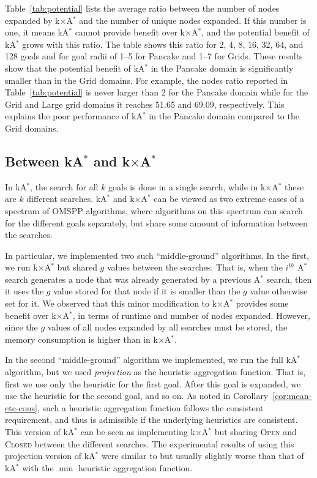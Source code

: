 \documentclass[smallextended]{svjour3}       %
\newcommand{\omspp}{\ac{OMSPP}\xspace}
\newcommand{\astar}{A$^*$\xspace}
\newcommand{\kastar}{kA$^*$\xspace}
\newcommand{\kxastar}{k$\times$A$^*$\xspace}
\newcommand{\open}{\textsc{Open}\xspace}
\newcommand{\closed}{\textsc{Closed}\xspace}
\newcommand{\axiomcons}{consistent\xspace}
\begin{document}
Table~\ref{tab:potential} lists the average ratio between the number of nodes expanded by \kxastar and the number of unique nodes expanded. If this number is one, it means \kastar cannot provide benefit over \kxastar, and the potential benefit of \kastar grows with this ratio. 
The table shows this ratio for 2, 4, 8, 16, 32, 64, and 128 goals and for goal radii of 1--5 for Pancake and 1--7 for Grids. 
These results show that the potential benefit of \kastar in the Pancake domain is significantly smaller than in the Grid domains. For example, the nodes ratio reported in Table~\ref{tab:potential} is never larger than 2 for the Pancake domain while for the Grid and Large grid domains it reaches 51.65 and 69.09, respectively. 
This explains the poor performance of \kastar in the Pancake domain compared to the Grid domains.  



\subsection{Between \kastar and \kxastar}
In \kastar, the search for all $k$ goals is done in a single search, while in \kxastar these are $k$ different searches. \kastar and \kxastar can be viewed as two extreme cases of a spectrum of \omspp algorithms, where algorithms on this spectrum can search for the different goals separately, but share some amount of information between the searches. 

In particular, we implemented two such ``middle-ground'' algorithms. In the first, we run \kxastar but shared $g$ values between the searches. That is, when the $i^{th}$ \astar search generates a node that was already generated by a previous \astar search, then it uses the $g$ value stored for that node if it is smaller than the $g$ value otherwise set for it. We observed that this minor modification to \kxastar provides some benefit over \kxastar, 
in terms of runtime and number of nodes expanded. However, since the $g$ values of all nodes expanded by all searches must be stored, the memory consumption is higher than in \kxastar. 

In the second ``middle-ground'' algorithm we implemented, we run the full \kastar algorithm, but we used \emph{projection} as the heuristic aggregation function. That is, first we use only the heuristic for the first goal. After this goal is expanded, we use the heuristic for the second goal, and so on. 
As noted in Corollary~\ref{cor:mean-etc-cons}, such a heuristic aggregation function follows the \axiomcons requirement, and thus is admissible if the underlying heuristics are consistent. This version of \kastar can be seen as implementing \kxastar but sharing \open and \closed between the different searches. 
The experimental results of using this projection version of \kastar were similar to but usually slightly worse than that of \kastar with the $\min$ heuristic aggregation function.  
\end{document}
